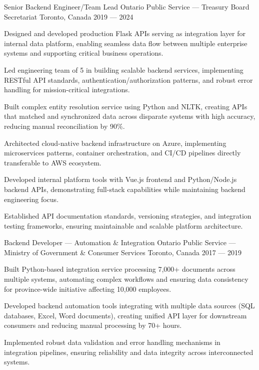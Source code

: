 \begin{cventries}
\cventry%
	{Senior Backend Engineer/Team Lead}
	{Ontario Public Service --- Treasury Board Secretariat}
	{Toronto, Canada}
	{2019 --- 2024}
	{
		\begin{cvitems}
			\item Designed and developed production Flask APIs serving as integration layer for internal data platform, enabling seamless data flow between multiple enterprise systems and supporting critical business operations.
			\item Led engineering team of 5 in building scalable backend services, implementing RESTful API standards, authentication/authorization patterns, and robust error handling for mission-critical integrations.
			\item Built complex entity resolution service using Python and NLTK, creating APIs that matched and synchronized data across disparate systems with high accuracy, reducing manual reconciliation by 90\%.
			\item Architected cloud-native backend infrastructure on Azure, implementing microservices patterns, container orchestration, and CI/CD pipelines directly transferable to AWS ecosystem.
			\item Developed internal platform tools with Vue.js frontend and Python/Node.js backend APIs, demonstrating full-stack capabilities while maintaining backend engineering focus.
			\item Established API documentation standards, versioning strategies, and integration testing frameworks, ensuring maintainable and scalable platform architecture.
		\end{cvitems}
	}

\cventry%
	{Backend Developer --- Automation \& Integration}
	{Ontario Public Service --- Ministry of Government \& Consumer Services}
	{Toronto, Canada}
	{2017 --- 2019}
	{
		\begin{cvitems}
			\item Built Python-based integration service processing 7,000+ documents across multiple systems, automating complex workflows and ensuring data consistency for province-wide initiative affecting 10,000 employees.
			\item Developed backend automation tools integrating with multiple data sources (SQL databases, Excel, Word documents), creating unified API layer for downstream consumers and reducing manual processing by 70+ hours.
			\item Implemented robust data validation and error handling mechanisms in integration pipelines, ensuring reliability and data integrity across interconnected systems.
		\end{cvitems}
	}


\end{cventries}
